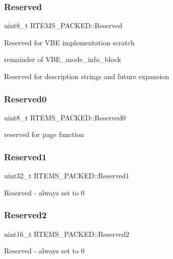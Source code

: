 \subsubsection{\texorpdfstring{Reserved}{Reserved}}
{\footnotesize\ttfamily uint8\+\_\+t R\+T\+E\+M\+S\+\_\+\+P\+A\+C\+K\+E\+D\+::\+Reserved}

Reserved for V\+BE implementation scratch

remainder of V\+B\+E\+\_\+mode\+\_\+info\+\_\+block

Reserved for description strings and future expansion \mbox{\label{structRTEMS__PACKED_a71d2cdd271c701fb8ccf016306d605e7}} 
\subsubsection{\texorpdfstring{Reserved0}{Reserved0}}
{\footnotesize\ttfamily uint8\+\_\+t R\+T\+E\+M\+S\+\_\+\+P\+A\+C\+K\+E\+D\+::\+Reserved0}

reserved for page function \mbox{\label{structRTEMS__PACKED_a8ebcccb23039a1755e787d0787a63bc5}} 
\subsubsection{\texorpdfstring{Reserved1}{Reserved1}}
{\footnotesize\ttfamily uint32\+\_\+t R\+T\+E\+M\+S\+\_\+\+P\+A\+C\+K\+E\+D\+::\+Reserved1}

Reserved -\/ always set to 0 \mbox{\label{structRTEMS__PACKED_aaead0516ac543c139ae20b0a6c374e0b}} 
\subsubsection{\texorpdfstring{Reserved2}{Reserved2}}
{\footnotesize\ttfamily uint16\+\_\+t R\+T\+E\+M\+S\+\_\+\+P\+A\+C\+K\+E\+D\+::\+Reserved2}

Reserved -\/ always set to 0 \mbox{\label{structRTEMS__PACKED_a119eb9019560e8f6143b097c92fbd437}} 
